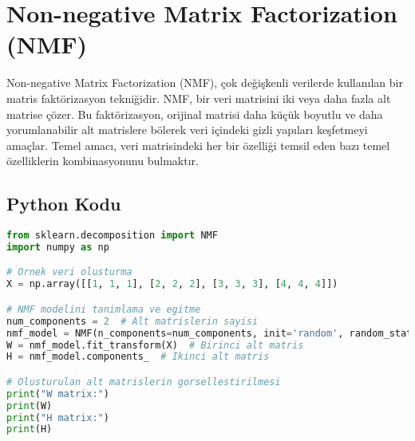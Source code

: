 \section{Non-negative Matrix Factorization (NMF)}
Non-negative Matrix Factorization (NMF), çok değişkenli verilerde kullanılan bir matris faktörizasyon tekniğidir. NMF, bir veri matrisini iki veya daha fazla alt matrise çözer. Bu faktörizasyon, orijinal matrisi daha küçük boyutlu ve daha yorumlanabilir alt matrislere bölerek veri içindeki gizli yapıları keşfetmeyi amaçlar. Temel amacı, veri matrisindeki her bir özelliği temsil eden bazı temel özelliklerin kombinasyonunu bulmaktır.

\subsection{Python Kodu}

\begin{lstlisting}[language=Python]
from sklearn.decomposition import NMF
import numpy as np

# Ornek veri olusturma
X = np.array([[1, 1, 1], [2, 2, 2], [3, 3, 3], [4, 4, 4]])

# NMF modelini tanimlama ve egitme
num_components = 2  # Alt matrislerin sayisi
nmf_model = NMF(n_components=num_components, init='random', random_state=42)
W = nmf_model.fit_transform(X)  # Birinci alt matris
H = nmf_model.components_  # Ikinci alt matris

# Olusturulan alt matrislerin gorsellestirilmesi
print("W matrix:")
print(W)
print("H matrix:")
print(H)
\end{lstlisting}

\newpage